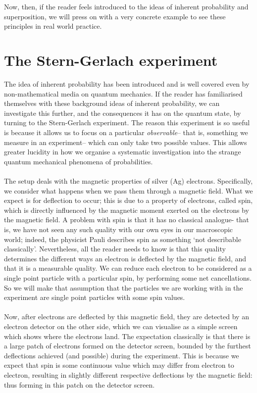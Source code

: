 \\\\
Now, then, if the reader feels introduced to the ideas of inherent probability and superposition, we will press on with a very concrete example to see these principles in real world practice.
\section{The Stern-Gerlach experiment}
The idea of inherent probability has been introduced and is well covered even by non-mathematical media on quantum mechanics. If the reader has familiarised themselves with these background ideas of inherent probability, we can investigate this further, and the consequences it has on the quantum state, by turning to the Stern-Gerlach experiment. The reason this experiment is so useful is because it allows us to focus on a particular \textit{observable}-- that is, something we measure in an experiment-- which can only take two possible values. This allows greater lucidity in how we organise a systematic investigation into the strange quantum mechanical phenomena of probabilities.
\\\\
The setup deals with the magnetic properties of silver (Ag) electrons. Specifically, we consider what happens when we pass them through a magnetic field. What we expect is for deflection to occur; this is due to a property of electrons, called spin, which is directly influenced by the magnetic moment exerted on the electrons by the magnetic field. A problem with spin is that it has no classical analogue- that is, we have not seen any such quality with our own eyes in our macroscopic world; indeed, the physicist Pauli describes spin as something `not describable classically'. Nevertheless, all the reader needs to know is that this quality determines the different ways an electron is deflected by the magnetic field, and that it is a measurable quality. We can reduce each electron to be considered as a single point particle with a particular spin, by performing some net cancellations. So we will make that assumption that the particles we are working with in the experiment are single point particles with some spin values.
\\\\
Now, after electrons are deflected by this magnetic field, they are detected by an electron detector on the other side, which we can visualise as a simple screen which shows where the electrons land. The expectation classically is that there is a large patch of electrons formed on the detector screen, bounded by the furthest deflections achieved (and possible) during the experiment. This is because we expect that spin is some continuous value which may differ from electron to electron, resulting in slightly different respective deflections by the magnetic field: thus forming in this patch on the detector screen.
